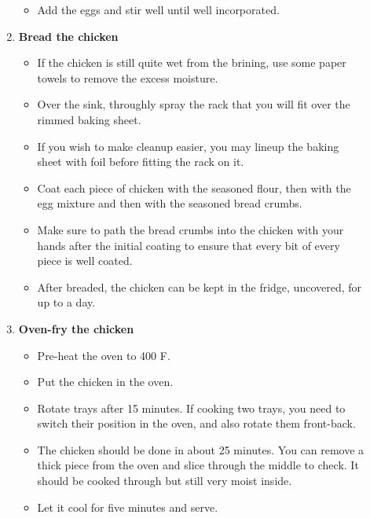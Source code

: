\documentclass[11pt,letterpaper]{article}
\begin{document}
\begin{description}
\begin{enumerate}
\begin{itemize}
	\item Add the eggs and stir well until well incorporated.
	\end{itemize}
	\item {\bf Bread the chicken}	
	\begin{itemize}
	\item If the chicken is still quite wet from the brining, use some paper towels to remove the excess moisture.
	\item Over the sink, throughly spray the rack that you will fit over the rimmed baking sheet.
	\item If you wish to make cleanup easier, you may lineup the baking sheet with foil before fitting the rack on it.
	\item Coat each piece of chicken with the seasoned flour, then with the egg mixture and then with the seasoned bread crumbs.
	\item Make sure to path the bread crumbs into the chicken with your hands after the initial coating to ensure that every bit of every piece is well coated.
	\item After breaded, the chicken can be kept in the fridge, uncovered, for up to a day.
	\end{itemize}
	\item {\bf Oven-fry the chicken}
	\begin{itemize}
	\item Pre-heat the oven to 400 F.
	\item Put the chicken in the oven.
	\item Rotate trays after 15 minutes. If cooking two trays, you need to switch their position in the oven, and also rotate them front-back.
	\item The chicken should be done in about 25 minutes. You can remove a thick piece from the oven and slice through the middle to check. It should be cooked through but still very moist inside.
	\item Let it cool for five minutes and serve.
	\end{itemize}	
      	\end{enumerate}         
\end{description}
\end{document}
